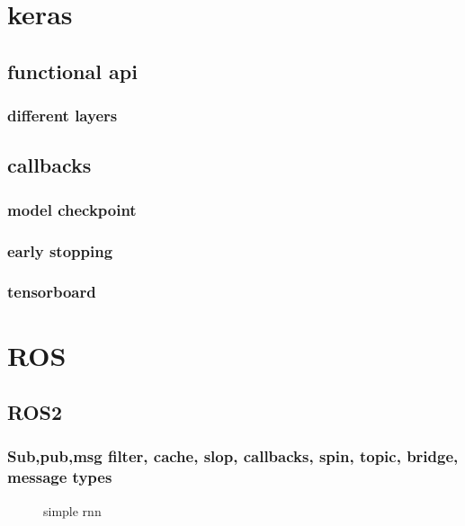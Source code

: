 \section{keras}
\subsection{functional api}
\subsubsection*{different layers}
\subsection{callbacks}
\subsubsection*{model checkpoint}
\subsubsection*{early stopping}
\subsubsection*{tensorboard}

\section{ROS}
\subsection{ROS2}
\subsubsection*{Sub,pub,msg filter, cache, slop, callbacks, spin, topic, bridge, message
types}







\begin{figure}[h]
	\centering
        \def\svgwidth{0.8\textwidth}
\begin{tiny}
        

\end{tiny}

    \caption{simple rnn}
    \label{fig:rnn}
\end{figure}


